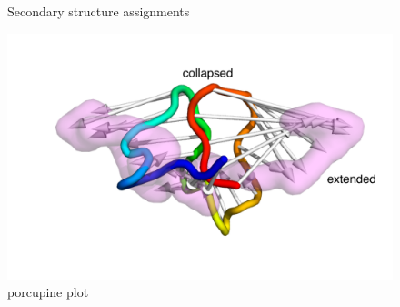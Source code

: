 \begin{figure}
	\thispagestyle{empty}
	\centering     %
	\caption{Secondary structure assignments}
	\clearpage
	\label{fig:pca}
\end{figure}




\begin{figure}
\includegraphics[height=0.45\textheight]{figures/yd_porcupine.png}
\caption{porcupine plot}
\label{fig:porcupine}
\end{figure}  


